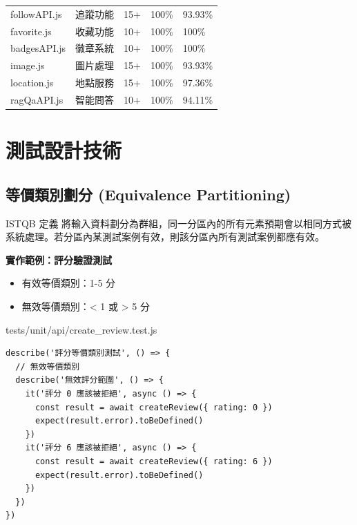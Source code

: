 \documentclass[11pt, a4paper]{article}
\begin{document}
\begin{center}
\begin{longtable}{p{} p{} p{} p{} p{}}
    \rowcolor{LightGray} followAPI.js                    & 追蹤功能                     & 15+                       & 100\%                       & 93.93\%                      \\
    favorite.js                                          & 收藏功能                     & 10+                       & 100\%                       & 100\%                        \\
    \rowcolor{LightGray} badgesAPI.js                    & 徽章系統                     & 10+                       & 100\%                       & 100\%                        \\
    image.js                                             & 圖片處理                     & 15+                       & 100\%                       & 93.93\%                      \\
    \rowcolor{LightGray} location.js                     & 地點服務                     & 15+                       & 100\%                       & 97.36\%                      \\
    ragQaAPI.js                                          & 智能問答                     & 10+                       & 100\%                       & 94.11\%                      \\
  \end{longtable}
\end{center}

\section{測試設計技術}

\subsection{等價類別劃分 (Equivalence Partitioning)}

\begin{calloutbox}{ISTQB 定義}
  將輸入資料劃分為群組，同一分區內的所有元素預期會以相同方式被系統處理。若分區內某測試案例有效，則該分區內所有測試案例都應有效。
\end{calloutbox}

\textbf{實作範例：評分驗證測試}
\begin{itemize}
  \item 有效等價類別：1-5 分
  \item 無效等價類別：< 1 或 > 5 分
\end{itemize}

\begin{codebox}{tests/unit/api/create\_review.test.js}
  \begin{lstlisting}
describe('評分等價類別測試', () => {
  // 無效等價類別
  describe('無效評分範圍', () => {
    it('評分 0 應該被拒絕', async () => {
      const result = await createReview({ rating: 0 })
      expect(result.error).toBeDefined()
    })
    it('評分 6 應該被拒絕', async () => {
      const result = await createReview({ rating: 6 })
      expect(result.error).toBeDefined()
    })
  })
})
\end{lstlisting}
\end{codebox}
\end{document}
